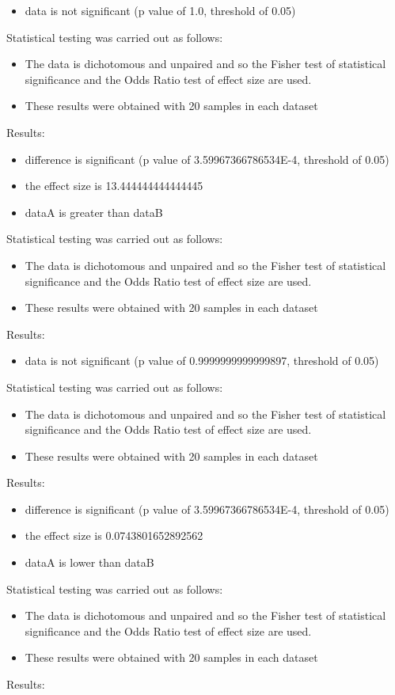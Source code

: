\documentclass[]{article}
\begin{document}
\begin{itemize}
\item{data is not significant (p value of 1.0, threshold of 0.05)}
\end{itemize}Statistical testing was carried out as follows: \begin{itemize}
\item{The data is dichotomous and unpaired and so the Fisher test of statistical significance and the Odds Ratio test of effect size are used.}
\item{These results were obtained with 20 samples in each dataset}
\end{itemize}Results:
\begin{itemize}
\item{difference is significant (p value of 3.59967366786534E-4, threshold of 0.05)}
\item{the effect size is 13.444444444444445}
\item{dataA is greater than dataB}
\end{itemize}Statistical testing was carried out as follows: \begin{itemize}
\item{The data is dichotomous and unpaired and so the Fisher test of statistical significance and the Odds Ratio test of effect size are used.}
\item{These results were obtained with 20 samples in each dataset}
\end{itemize}Results:
\begin{itemize}
\item{data is not significant (p value of 0.9999999999999897, threshold of 0.05)}
\end{itemize}Statistical testing was carried out as follows: \begin{itemize}
\item{The data is dichotomous and unpaired and so the Fisher test of statistical significance and the Odds Ratio test of effect size are used.}
\item{These results were obtained with 20 samples in each dataset}
\end{itemize}Results:
\begin{itemize}
\item{difference is significant (p value of 3.59967366786534E-4, threshold of 0.05)}
\item{the effect size is 0.0743801652892562}
\item{dataA is lower than dataB}
\end{itemize}Statistical testing was carried out as follows: \begin{itemize}
\item{The data is dichotomous and unpaired and so the Fisher test of statistical significance and the Odds Ratio test of effect size are used.}
\item{These results were obtained with 20 samples in each dataset}
\end{itemize}Results:
\end{document}
